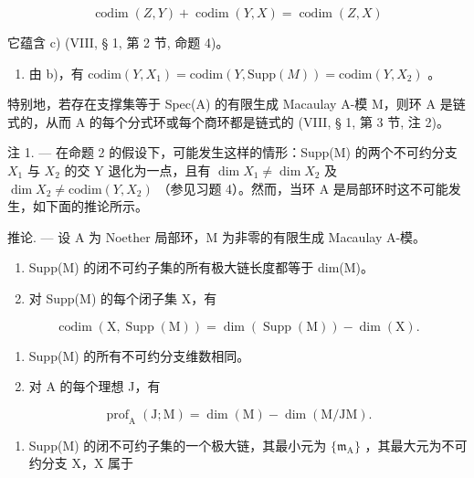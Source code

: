 \[
\operatorname{codim} (Z, Y) + \operatorname{codim} (Y, X) = \operatorname{codim} (Z, X)
\]

它蕴含 c) (VIII, § 1, 第 2 节, 命题 4)。

\begin{enumerate}
\def\labelenumi{\alph{enumi})}
\setcounter{enumi}{3}
\tightlist
\item
  由 b)，有 \(\text{codim}(Y, X_1) = \text{codim}(Y, \text{Supp}(M)) = \text{codim}(Y, X_2)\) 。
\end{enumerate}

特别地，若存在支撑集等于 Spec(A) 的有限生成 Macaulay A-模 M，则环 A 是链式的，从而 A 的每个分式环或每个商环都是链式的 (VIII, § 1, 第 3 节, 注 2)。

注 1. — 在命题 2 的假设下，可能发生这样的情形：Supp(M) 的两个不可约分支 \(X_{1}\) 与 \(X_{2}\) 的交 Y 退化为一点，且有 \(\dim X_{1} \neq \dim X_{2}\) 及 \(\dim X_{2} \neq \text{codim}(Y, X_{2})\) （参见习题 4）。然而，当环 A 是局部环时这不可能发生，如下面的推论所示。

推论. — 设 A 为 Noether 局部环，M 为非零的有限生成 Macaulay A-模。

\begin{enumerate}
\def\labelenumi{\alph{enumi})}
\item
  Supp(M) 的闭不可约子集的所有极大链长度都等于 dim(M)。
\item
  对 Supp(M) 的每个闭子集 X，有
\end{enumerate}

\[
\operatorname{codim} (\mathrm{X}, \operatorname{Supp} (\mathrm{M})) = \dim (\operatorname{Supp} (\mathrm{M})) - \dim (\mathrm{X}).
\]

\begin{enumerate}
\def\labelenumi{\alph{enumi})}
\setcounter{enumi}{2}
\item
  Supp(M) 的所有不可约分支维数相同。
\item
  对 A 的每个理想 J，有
\end{enumerate}

\[
\operatorname{prof} _ {\mathrm{A}} (\mathrm{J}; \mathrm{M}) = \dim (\mathrm{M}) - \dim (\mathrm{M} / \mathrm{JM}).
\]

\begin{enumerate}
\def\labelenumi{\alph{enumi})}
\tightlist
\item
  Supp(M) 的闭不可约子集的一个极大链，其最小元为 \(\{\mathfrak{m}_{\mathrm{A}}\}\) ，其最大元为不可约分支 X，X 属于
\end{enumerate}

